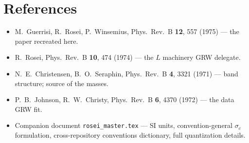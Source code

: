 \documentclass[11pt,a4paper]{article}
\numberwithin{equation}{section}
\begin{document}
\section*{References}
\begin{itemize}
\item M.~Guerrisi, R.~Rosei, P.~Winsemius, Phys.\ Rev.\ B
\textbf{12}, 557 (1975) --- the paper recreated here.
\item R.~Rosei, Phys.\ Rev.\ B \textbf{10}, 474 (1974) --- the $L$
machinery GRW delegate.
\item N.~E.~Christensen, B.~O.~Seraphin, Phys.\ Rev.\ B \textbf{4},
3321 (1971) --- band structure; source of the masses.
\item P.~B.~Johnson, R.~W.~Christy, Phys.\ Rev.\ B \textbf{6}, 4370
(1972) --- the data GRW fit.
\item Companion document \texttt{rosei\_master.tex} --- SI units,
convention-general $\sigma_c$ formulation, cross-repository
conventions dictionary, full quantization details.
\end{itemize}
\end{document}
